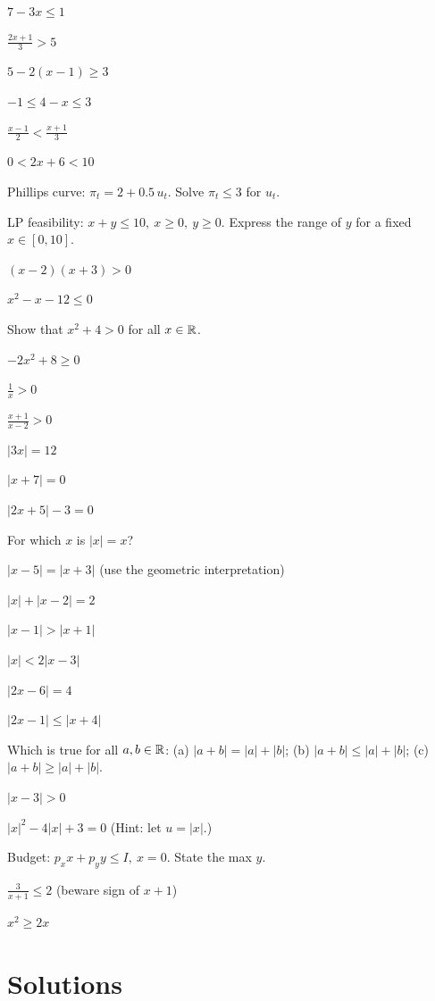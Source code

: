 \begin{problems}
  \item $7-3x\le 1$
  \item $\displaystyle\frac{2x+1}{3}>5$
  \item $5-2(x-1)\ge 3$
  \item $-1\le 4-x\le 3$
  \item $\displaystyle\frac{x-1}{2}<\frac{x+1}{3}$
  \item $0<2x+6<10$
  \item Phillips curve: $\pi_{t}=2+0.5\,u_{t}$. Solve $\pi_{t}\le 3$ for
        $u_{t}$.
  \item LP feasibility: $x+y\le 10,\ x\ge 0,\ y\ge 0$. Express the range of
        $y$ for a fixed $x\in[0,10]$.
  \item $(x-2)(x+3)>0$
  \item $x^{2}-x-12\le 0$
  \item Show that $x^{2}+4>0$ for all $x\in\mathbb{R}$.
  \item $-2x^{2}+8\ge 0$
  \item $\displaystyle\frac{1}{x}>0$
  \item $\displaystyle\frac{x+1}{x-2}>0$
  \item $|3x|=12$
  \item $|x+7|=0$
  \item $|2x+5|-3=0$
  \item For which $x$ is $|x|=x$?
  \item $|x-5|=|x+3|$ (use the geometric interpretation)
  \item $|x|+|x-2|=2$
  \item $|x-1|>|x+1|$
  \item $|x|<2|x-3|$
  \item $|2x-6|=4$
  \item $|2x-1|\le|x+4|$
  \item Which is true for all $a,b\in\mathbb{R}$:
        (a) $|a+b|=|a|+|b|$;
        (b) $|a+b|\le|a|+|b|$;
        (c) $|a+b|\ge|a|+|b|$.
  \item $|x-3|>0$
  \item $|x|^{2}-4|x|+3=0$ (Hint: let $u=|x|$.)
  \item Budget: $p_{x}x+p_{y}y\le I,\ x=0$. State the max $y$.
  \item $\displaystyle\frac{3}{x+1}\le 2$ (beware sign of $x+1$)
  \item $x^{2}\ge 2x$
\end{problems}

\section{Solutions}

